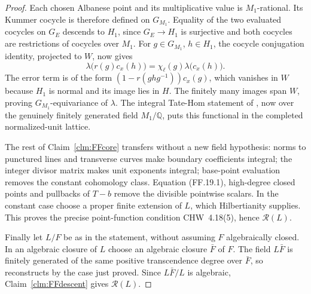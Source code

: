\begin{proof}
Each chosen Albanese point and its multiplicative value is
\(M_1\)-rational. Its Kummer cocycle is therefore defined on
\(G_{M_1}\). Equality of the two evaluated cocycles on
\(G_E\) descends to \(H_1\), since \(G_E\to H_1\) is
surjective and both cocycles are restrictions of cocycles over
\(M_1\). For \(g\in G_{M_1}\), \(h\in H_1\), the
cocycle conjugation identity, projected to \(W\), now gives
\[
 \lambda\bigl(r(g)c_x(h)\bigr)
             =\chi_\ell(g)\lambda\bigl(c_x(h)\bigr).
\]
The error term is of the form
\((1-r(ghg^{-1}))c_x(g)\), which vanishes in \(W\)
because \(H_1\) is normal and its image lies in \(H\).
The finitely many images span \(W\), proving
\(G_{M_1}\)-equivariance of \(\lambda\).
The integral Tate-Hom statement of
\citet[Section~1.4]{FF_Jossen2014}, now over the genuinely
finitely generated field \(M_1/\mathbb Q\), puts this
functional in the completed normalized-unit lattice.

The rest of Claim~\ref{clm:FFcore} transfers without a new
field hypothesis: norms to punctured lines and transverse curves
make boundary coefficients integral; the integer divisor matrix
makes unit exponents integral; base-point evaluation removes the
constant cohomology class. Equation (FF.19.1), high-degree closed
points and pullbacks of \(T-b\) remove the divisible pointwise
scalars. In the constant case choose a proper finite extension of
\(L\), which Hilbertianity supplies. This proves the precise
point-function condition CHW~4.18(5), hence \(\mathcal R(L)\).

Finally let \(L/F\) be as in the statement, without assuming
\(F\) algebraically closed. In an algebraic closure of \(L\)
choose an algebraic closure \(\bar F\) of \(F\). The field
\(L\bar F\) is finitely generated of the same positive
transcendence degree over \(\bar F\), so reconstructs by the
case just proved. Since \(L\bar F/L\) is algebraic,
Claim~\ref{clm:FFdescent} gives \(\mathcal R(L)\).
\end{proof}

